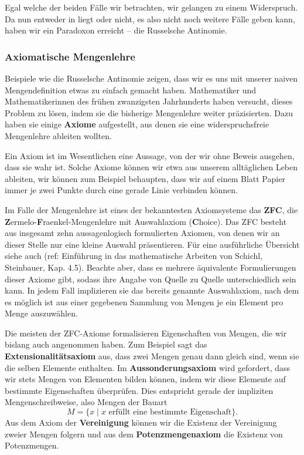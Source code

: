 \documentclass[../../main.tex]{subfiles}
\begin{document}
Egal welche der beiden Fälle wir betrachten, wir gelangen zu einem Widerspruch. Da \R nun entweder in \R liegt oder nicht, es also nicht noch weitere Fälle geben kann, haben wir ein Paradoxon erreicht -- die Russelsche Antinomie. 

\subsubsection{Axiomatische Mengenlehre}
Beispiele wie die Russelsche Antinomie zeigen, dass wir es uns mit unserer naiven Mengendefinition etwas zu einfach gemacht haben. Mathematiker und Mathematikerinnen des frühen zwanzigsten Jahrhunderts haben versucht, dieses Problem zu lösen, indem sie die bisherige Mengenlehre weiter präzisierten. Dazu haben sie einige \textbf{Axiome} aufgestellt, aus denen sie eine widerspruchsfreie Mengenlehre ableiten wollten.

Ein Axiom ist im Wesentlichen eine Aussage, von der wir ohne Beweis ausgehen, dass sie wahr ist. Solche Axiome können wir etwa aus unserem alltäglichen Leben ableiten, wir können zum Beispiel behaupten, dass wir auf einem Blatt Papier immer je zwei Punkte durch eine gerade Linie verbinden können.

Im Falle der Mengenlehre ist eines der bekanntesten Axiomsysteme das \textbf{ZFC}, die \textbf{Z}ermelo-\textbf{F}raenkel-Mengenlehre mit Auswahlaxiom (\textbf{C}hoice). Das ZFC besteht aus insgesamt zehn aussagenlogisch formulierten Axiomen, von denen wir an dieser Stelle nur eine kleine Auswahl präsentieren. Für eine ausführliche Übersicht siehe auch (ref: Einführung in das mathematische Arbeiten von Schichl, Steinbauer, Kap. 4.5). Beachte aber, dass es mehrere äquivalente Formulierungen dieser Axiome gibt, sodass ihre Angabe von Quelle zu Quelle unterschiedlich sein kann. In jedem Fall implizieren sie das bereits genannte Auswahlaxiom, nach dem es möglich ist aus einer gegebenen Sammlung von Mengen je ein Element pro Menge auszuwählen.

Die meisten der ZFC-Axiome formalisieren Eigenschaften von Mengen, die wir bislang auch angenommen haben. Zum Beispiel sagt das \textbf{Extensionalitätsaxiom} aus, dass zwei Mengen genau dann gleich sind, wenn sie die selben Elemente enthalten. Im \textbf{Aussonderungsaxiom} wird gefordert, dass wir stets Mengen von Elementen bilden können, indem wir diese Elemente auf bestimmte Eigenschaften überprüfen. Dies entspricht gerade der impliziten Mengenschreibweise, also Mengen der Bauart $$M = \{x \mid x \text{ erfüllt eine bestimmte Eigenschaft}\}.$$ Aus dem Axiom der \textbf{Vereinigung} können wir die Existenz der Vereinigung zweier Mengen folgern und aus dem \textbf{Potenzmengenaxiom} die Existenz von Potenzmengen. 
\end{document}
